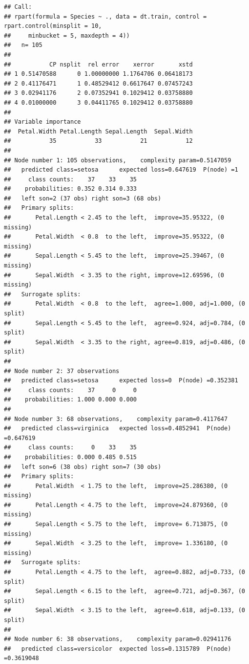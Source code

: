 \documentclass[]{book}
\theoremstyle{plain}
\theoremstyle{definition}
\theoremstyle{definition}
\theoremstyle{definition}
\theoremstyle{definition}
\theoremstyle{remark}
\begin{document}
\begin{verbatim}
## Call:
## rpart(formula = Species ~ ., data = dt.train, control = rpart.control(minsplit = 10, 
##     minbucket = 5, maxdepth = 4))
##   n= 105 
## 
##           CP nsplit  rel error    xerror       xstd
## 1 0.51470588      0 1.00000000 1.1764706 0.06418173
## 2 0.41176471      1 0.48529412 0.6617647 0.07457243
## 3 0.02941176      2 0.07352941 0.1029412 0.03758880
## 4 0.01000000      3 0.04411765 0.1029412 0.03758880
## 
## Variable importance
##  Petal.Width Petal.Length Sepal.Length  Sepal.Width 
##           35           33           21           12 
## 
## Node number 1: 105 observations,    complexity param=0.5147059
##   predicted class=setosa      expected loss=0.647619  P(node) =1
##     class counts:    37    33    35
##    probabilities: 0.352 0.314 0.333 
##   left son=2 (37 obs) right son=3 (68 obs)
##   Primary splits:
##       Petal.Length < 2.45 to the left,  improve=35.95322, (0 missing)
##       Petal.Width  < 0.8  to the left,  improve=35.95322, (0 missing)
##       Sepal.Length < 5.45 to the left,  improve=25.39467, (0 missing)
##       Sepal.Width  < 3.35 to the right, improve=12.69596, (0 missing)
##   Surrogate splits:
##       Petal.Width  < 0.8  to the left,  agree=1.000, adj=1.000, (0 split)
##       Sepal.Length < 5.45 to the left,  agree=0.924, adj=0.784, (0 split)
##       Sepal.Width  < 3.35 to the right, agree=0.819, adj=0.486, (0 split)
## 
## Node number 2: 37 observations
##   predicted class=setosa      expected loss=0  P(node) =0.352381
##     class counts:    37     0     0
##    probabilities: 1.000 0.000 0.000 
## 
## Node number 3: 68 observations,    complexity param=0.4117647
##   predicted class=virginica   expected loss=0.4852941  P(node) =0.647619
##     class counts:     0    33    35
##    probabilities: 0.000 0.485 0.515 
##   left son=6 (38 obs) right son=7 (30 obs)
##   Primary splits:
##       Petal.Width  < 1.75 to the left,  improve=25.286380, (0 missing)
##       Petal.Length < 4.75 to the left,  improve=24.879360, (0 missing)
##       Sepal.Length < 5.75 to the left,  improve= 6.713875, (0 missing)
##       Sepal.Width  < 3.25 to the left,  improve= 1.336180, (0 missing)
##   Surrogate splits:
##       Petal.Length < 4.75 to the left,  agree=0.882, adj=0.733, (0 split)
##       Sepal.Length < 6.15 to the left,  agree=0.721, adj=0.367, (0 split)
##       Sepal.Width  < 3.15 to the left,  agree=0.618, adj=0.133, (0 split)
## 
## Node number 6: 38 observations,    complexity param=0.02941176
##   predicted class=versicolor  expected loss=0.1315789  P(node) =0.3619048

\end{verbatim}
\end{document}
